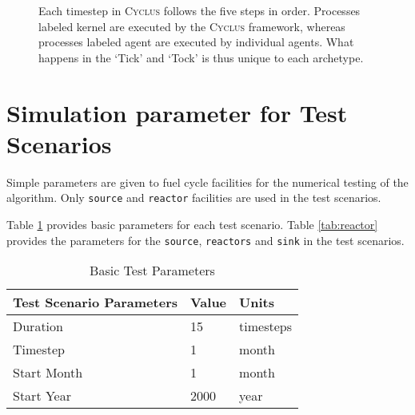 \documentclass[11pt,letterpaper]{article}
\newcommand{\Cyclus}{\textsc{Cyclus}\xspace}%
\begin{document}
\begin{figure}[H]
\centering
{}
\caption{Each timestep in \Cyclus follows the five steps in order. Processes labeled
         kernel are executed by the \Cyclus framework, whereas processes labeled agent
         are executed by individual agents. What happens in the `Tick' and `Tock' is
         thus unique to each archetype.}
\label{diag:time}
\end{figure}


\section{Simulation parameter for Test Scenarios}
Simple parameters are given to fuel cycle facilities for the numerical testing of 
the algorithm.  Only \texttt{source} and \texttt{reactor} facilities are used in the test scenarios. 

Table \ref{tab:testscenario} provides basic parameters for each test scenario. Table \ref{tab:reactor} provides the parameters for the \texttt{source}, \texttt{reactors} and \texttt{sink} in the test scenarios.

\begin{table}[H]
	\centering
	\caption {Basic Test Parameters}
	\label{tab:testscenario}
	\begin{tabular}{|l|l|l|}
		\hline
		\textbf{Test Scenario Parameters} & \textbf{Value} & \textbf{Units} \\
		\hline
		Duration & 15 & timesteps \\
		Timestep & 1 & month \\
		Start Month & 1 & month \\
		Start Year & 2000 & year \\
		\hline
	\end{tabular}
\end{table}
\end{document}
